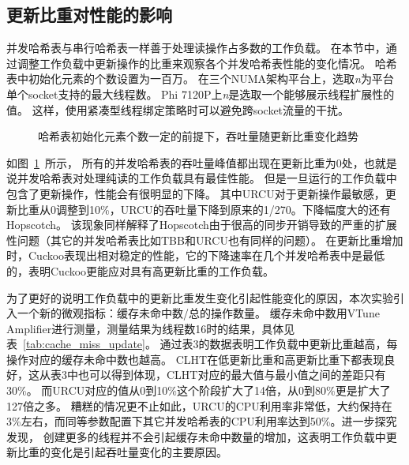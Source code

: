 \subsection{更新比重对性能的影响}
\label{sec:impact_update}
并发哈希表与串行哈希表一样善于处理读操作占多数的工作负载。
在本节中，通过调整工作负载中更新操作的比重来观察各个并发哈希表性能的变化情况。
哈希表中初始化元素的个数设置为一百万。
在三个NUMA架构平台上，选取\textit{n}为平台单个socket支持的最大线程数。
Phi 7120P上\textit{n}是选取一个能够展示线程扩展性的值。
这样，使用紧凑型线程绑定策略时可以避免跨socket流量的干扰。

\begin{figure}[htbp]
\centering
\subfigure[Phi 7120P, n = 60]{\texttt{[image: 7120U10]}}
\caption{哈希表初始化元素个数一定的前提下，吞吐量随更新比重变化趋势}
\label{fig:update}
\end{figure}

如图~\ref{fig:update}~所示，
所有的并发哈希表的吞吐量峰值都出现在更新比重为0处，也就是说并发哈希表对处理纯读的工作负载具有最佳性能。
但是一旦运行的工作负载中包含了更新操作，性能会有很明显的下降。
其中URCU对于更新操作最敏感，更新比重从0调整到10\%，URCU的吞吐量下降到原来的1/270。下降幅度大的还有Hopscotch。
该现象同样解释了Hopscotch由于很高的同步开销导致的严重的扩展性问题（其它的并发哈希表比如TBB和URCU也有同样的问题）。
在更新比重增加时，Cuckoo表现出相对稳定的性能，它的下降速率在几个并发哈希表中是最低的，表明Cuckoo更能应对具有高更新比重的工作负载。

为了更好的说明工作负载中的更新比重发生变化引起性能变化的原因，本次实验引入一个新的微观指标：缓存未命中数/总的操作数量。
缓存未命中数用VTune Amplifier进行测量，测量结果为线程数16时的结果，具体见表~\ref{tab:cache_miss_update}。
通过表3的数据表明工作负载中更新比重越高，每操作对应的缓存未命中数也越高。
CLHT在低更新比重和高更新比重下都表现良好，这从表3中也可以得到体现，CLHT对应的最大值与最小值之间的差距只有30\%。
而URCU对应的值从0到10\%这个阶段扩大了14倍，从0到80\%更是扩大了127倍之多。
糟糕的情况更不止如此，URCU的CPU利用率非常低，大约保持在3\%左右，而同等参数配置下其它并发哈希表的CPU利用率达到50\%。进一步探究发现，
创建更多的线程并不会引起缓存未命中数量的增加，这表明工作负载中更新比重的变化是引起吞吐量变化的主要原因。

